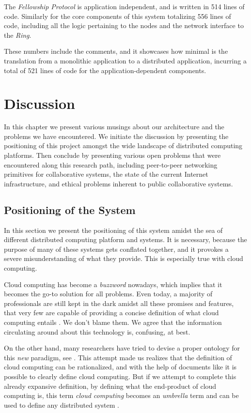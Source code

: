 \documentclass[12pt, titlepage]{uo_temp}
\begin{document}
     The \emph{Fellowship Protocol} is application independent, and is written in 514
     lines of code. Similarly for the core components of this system totalizing 556 lines
     of code, including all the logic pertaining to the nodes and the network interface to
     the \emph{Ring}.

     These numbers include the comments, and it showcases how minimal is the translation
     from a monolithic application to a distributed application, incurring a total of 521
     lines of code for the application-dependent components.

     \chapter{Discussion}
     In this chapter we present various musings about our architecture and the problems we
     have encountered. We initiate the discussion by presenting the positioning of this
     project amongst the wide landscape of distributed computing platforms. Then conclude
     by presenting various open problems that were encountered along this research path,
     including peer-to-peer networking primitives for collaborative systems, the state of
     the current Internet infrastructure, and ethical problems inherent to public
     collaborative systems.

     \section{Positioning of the System}
     In this section we present the positioning of this system amidst the sea of different
     distributed computing platform and systems. It is necessary, because the
     purpose of many of these systems gets conflated together, and it provokes a severe
     misunderstanding of what they provide. This is especially true with cloud computing.

     Cloud computing has become a \emph{buzzword} nowadays, which implies that it becomes
     the go-to solution for all problems. Even today, a majority of professionals are
     still kept in the dark amidst all these promises and features, that very few are
     capable of providing a concise definition of what cloud computing entails
     \cite{cloud_forbes} \cite{cloud_oneil}. We don't blame them. We agree that the
     information circulating around about this technology is, confusing, at best.

     On the other hand, many researchers have tried to devise a proper ontology for this
     \emph{new} paradigm, see \cite{ontology}. This attempt made us realizes that the
     definition of cloud computing can be rationalized, and with the help of documents
     like \cite{nist} it is possible to clearly define cloud computing. But if we attempt
     to complete this already expansive definition, by defining what the end-product of
     cloud computing is, this term \emph{cloud computing} becomes an \emph{umbrella} term
     and can be used to define any distributed system \cite{cloud_citrix} \cite{cloud_tech}.
\end{document}
